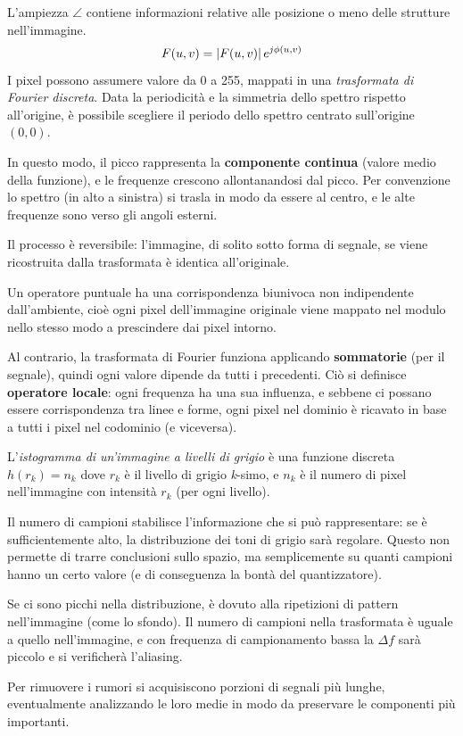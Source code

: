 L'ampiezza $\angle$ contiene informazioni relative alle posizione o meno delle strutture nell'immagine.
$$F(u, v) = \left|F(u, v)\right|e^{j\phi(u, v)}$$
I pixel possono assumere valore da 0 a 255, mappati in una \textit{trasformata di Fourier discreta}. Data la periodicità e la simmetria dello spettro rispetto all'origine, è possibile scegliere il periodo dello spettro centrato sull'origine $(0, 0)$.

In questo modo, il picco rappresenta la \textbf{componente continua} (valore medio della funzione), e le frequenze crescono allontanandosi dal picco. Per convenzione lo spettro (in alto a sinistra) si trasla in modo da essere al centro, e le alte frequenze sono verso gli angoli esterni.

Il processo è reversibile: l'immagine, di solito sotto forma di segnale, se viene ricostruita dalla trasformata è identica all'originale.

Un operatore puntuale ha una corrispondenza biunivoca non indipendente dall'ambiente, cioè ogni pixel dell'immagine originale viene mappato nel modulo nello stesso modo a prescindere dai pixel intorno.

Al contrario, la trasformata di Fourier funziona applicando \textbf{sommatorie} (per il segnale), quindi ogni valore dipende da tutti i precedenti. Ciò si definisce \textbf{operatore locale}: ogni frequenza ha una sua influenza, e sebbene ci possano essere corrispondenza tra linee e forme, ogni pixel nel dominio è ricavato in base a tutti i pixel nel codominio (e viceversa).

L'\textit{istogramma di un'immagine a livelli di grigio} è una funzione discreta $h(r_k) = n_k$ dove $r_k$ è il livello di grigio \textit{k}-simo, e $n_k$ è il numero di pixel nell'immagine con intensità $r_k$ (per ogni livello).

Il numero di campioni stabilisce l'informazione che si può rappresentare: se è sufficientemente alto, la distribuzione dei toni di grigio sarà regolare. Questo non permette di trarre conclusioni sullo spazio, ma semplicemente su quanti campioni hanno un certo valore (e di conseguenza la bontà del quantizzatore).

Se ci sono picchi nella distribuzione, è dovuto alla ripetizioni di pattern nell'immagine (come lo sfondo). Il numero di campioni nella trasformata è uguale a quello nell'immagine, e con frequenza di campionamento bassa la $\Delta f$ sarà piccolo e si verificherà l'aliasing. 

Per rimuovere i rumori si acquisiscono porzioni di segnali più lunghe, eventualmente analizzando le loro medie in modo da preservare le componenti più importanti.

